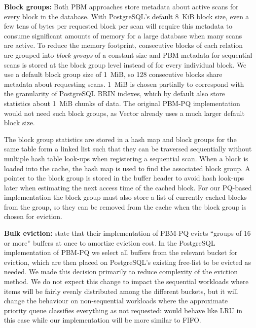 \textbf{Block groups:} Both PBM approaches store metadata about active scans for every block in the database. With PostgreSQL's default 8~KiB block size, even a few tens of bytes per requested block per scan will require this metadata to consume significant amounts of memory for a large database when many scans are active. To reduce the memory footprint, consecutive blocks of each relation are grouped into \textit{block groups} of a constant size and PBM metadata for sequential scans is stored at the block group level instead of for every individual block. We use a default block group size of 1~MiB, so 128 consecutive blocks share metadata about requesting scans. 1~MiB is chosen partially to correspond with the granularity of PostgreSQL BRIN indexes, which by default also store statistics about 1~MiB chunks of data. The original PBM-PQ implementation~\cite{pbm} would not need such block groups, as Vector already uses a much larger default block size. \cite{vectorDocs}  %

The block group statistics are stored in a hash map and block groups for the same table form a linked list such that they can be traversed sequentially without multiple hash table look-ups when registering a sequential scan. %
When a block is loaded into the cache, the hash map is used to find the associated block group. A pointer to the block group is stored in the buffer header to avoid hash look-ups later when estimating the next access time of the cached block. For our PQ-based implementation the block group must also store a list of currently cached blocks from the group, so they can be removed from the cache when the block group is chosen for eviction. 



\textbf{Bulk eviction:} \citet{pbm} state that their implementation of PBM-PQ evicts ``groups of 16 or more'' buffers at once to amortize eviction cost. In the PostgreSQL implementation of PBM-PQ we select all buffers from the relevant bucket for eviction, which are then placed on PostgreSQL's existing free-list to be evicted as needed. We made this decision primarily to reduce complexity of the eviction method. We do not expect this change to impact the sequential workloads where items will be fairly evenly distributed among the different buckets, but it will change the behaviour on non-sequential workloads where the approximate priority queue classifies everything as not requested: \cite{pbm} would behave like LRU in this case while our implementation will be more similar to FIFO.

